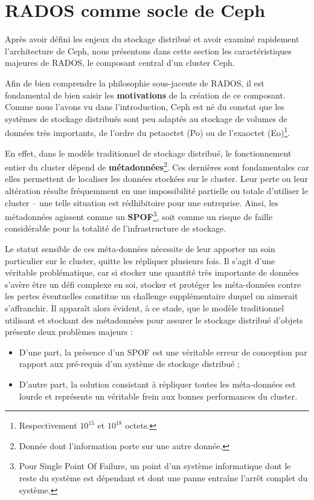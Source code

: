 \section{RADOS comme socle de Ceph} 

Après avoir défini les enjeux du stockage distribué et avoir examiné rapidement l'architecture de Ceph, nous présentons dans cette section les caractéristiques majeures de RADOS, le composant central d'un cluster Ceph.

Afin de bien comprendre la philosophie sous-jacente de RADOS, il est fondamental de bien saisir les \textbf{motivations} de la création de ce composant. Comme nous l'avons vu dans l'introduction, Ceph est né du constat que les systèmes de stockage distribués \fg{} sont peu adaptés au stockage de volumes de données très importants, de l'ordre du petaoctet (Po) ou de l'exaoctet (Eo)\footnote{Respectivement $10^{15}$ et $10^{18}$ octets.}. 

En effet, dans le modèle traditionnel de stockage distribué, le fonctionnement entier du cluster dépend de \textbf{métadonnées}\footnote{Donnée dont l'information porte sur une autre donnée.}. Ces dernières sont fondamentales car elles permettent de localiser les données stockées sur le cluster. Leur perte ou leur altération résulte fréquemment en une impossibilité partielle ou totale d'utiliser le cluster -- une telle situation est rédhibitoire pour une entreprise. Ainsi, les métadonnées agissent comme un \textbf{SPOF}\footnote{Pour Single Point Of Failure, un point d'un système informatique dont le reste du système est dépendant et dont une panne entraîne l'arrêt complet du système.}, soit comme un risque de faille considérable pour la totalité de l'infrastructure de stockage.

Le statut sensible de ces méta-données nécessite de leur apporter un soin particulier sur le cluster, quitte les répliquer plusieurs fois. Il s'agit d'une véritable problématique, car si stocker une quantité très importante de données s'avère être un défi complexe en soi, stocker et protéger les méta-données contre les pertes éventuelles constitue un challenge supplémentaire duquel on aimerait s'affranchir. Il apparaît alors évident, à ce stade, que le modèle \og{}traditionnel\fg{} utilisant et stockant des métadonnées pour assurer le stockage distribué d'objets présente deux problèmes majeurs :

\begin{itemize}
	\item D'une part, la présence d'un SPOF est une véritable erreur de conception par rapport aux pré-requis d'un système de stockage distribué ;
    \item D'autre part, la solution consistant à répliquer toutes les méta-données est lourde et représente un véritable frein aux bonnes performances du cluster.
\end{itemize}

